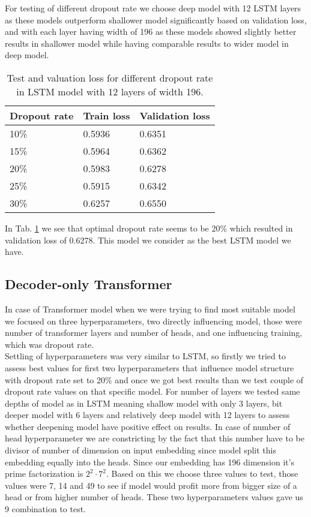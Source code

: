 For testing of different dropout rate we choose deep model with 12 LSTM layers as these models outperform shallower model significantly based on validation loss, and with each layer having width of 196 as these models showed slightly better results in shallower model while having comparable results to wider model in deep model.
\\

\begin{table}[!h]
	\centering
	\begin{tabular}{|l|l|l|}
		\hline
		Dropout rate & Train loss & Validation loss \\ \hline
		10\%         & 0.5936    & 0.6351                \\ \hline
		15\%         & 0.5964    & 0.6362                \\ \hline
		20\%         & 0.5983    & 0.6278                \\ \hline
		25\%         & 0.5915    & 0.6342                \\ \hline
		30\%         & 0.6257    & 0.6550                \\ \hline 
	\end{tabular}
	\caption{Test and valuation loss for different dropout rate in LSTM model with 12 layers of width 196.}
	\label{tab:lstm_dropout}
\end{table}

In Tab. \ref{tab:lstm_dropout} we see that optimal dropout rate seems to be 20\% which resulted in validation loss of 0.6278. This model we consider as the best LSTM model we have.

\subsection{Decoder-only Transformer}

In case of Transformer model when we were trying to find most suitable model we focused on three hyperparameters, two directly influencing model, those were number of transformer layers and number of heads, and one influencing training, which was dropout rate.
\\

Settling of hyperparameters was very similar to LSTM, so firstly we tried to assess best values for first two hyperparameters that influence model structure with dropout rate set to 20\% and once we got best results than we test couple of dropout rate values on that specific model. For number of layers we tested same depths of model as in LSTM meaning shallow model with only 3 layers, bit deeper model with 6 layers and relatively deep model with 12 layers to assess whether deepening model have positive effect on results. In case of number of head hyperparameter we are constricting by the fact that this number have to be divisor of number of dimension on input embedding since model split this embedding equally into the heads. Since our embedding has 196 dimension it's prime factorization is $2^2\cdot7^2$. Based on this we choose three values to test, those values were 7, 14 and 49 to see if model would profit more from bigger size of a head  or from higher number of heads. These two hyperparameters values gave us 9 combination to test.

